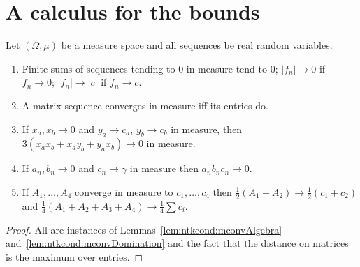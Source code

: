 \section{A calculus for the bounds}\label{sec:ntkdn:calculus}

\begin{lemma}\label{lem:ntkdn:decouplingBounds}
  \leanok
Let $(\Omega,\mu)$ be a measure space and all sequences be real random variables.
\begin{enumerate}
  \item Finite sums of sequences tending to $0$ in measure tend to $0$; $|f_n|\to0$ if $f_n\to0$; $|f_n|\to|c|$ if $f_n\to c$.
  \item A matrix sequence converges in measure iff its entries do.
  \item If $x_a,x_b\to0$ and $y_a\to c_a$, $y_b\to c_b$ in measure, then $3(x_ax_b+x_ay_b+y_ax_b)\to0$ in measure.
  \item If $a_n,b_n\to0$ and $c_n\to\gamma$ in measure then $a_nb_nc_n\to0$.
  \item If $A_1,\dots,A_4$ converge in measure to $c_1,\dots,c_4$ then $\tfrac12(A_1+A_2)\to\frac12(c_1+c_2)$ and $\tfrac14(A_1+A_2+A_3+A_4)\to\frac14\sum c_i$.
\end{enumerate}
\end{lemma}

\begin{proof}
  \leanok
All are instances of Lemmas~\ref{lem:ntkcond:mconvAlgebra} and~\ref{lem:ntkcond:mconvDomination} and the fact that the distance on matrices is the maximum over entries.
\end{proof}

